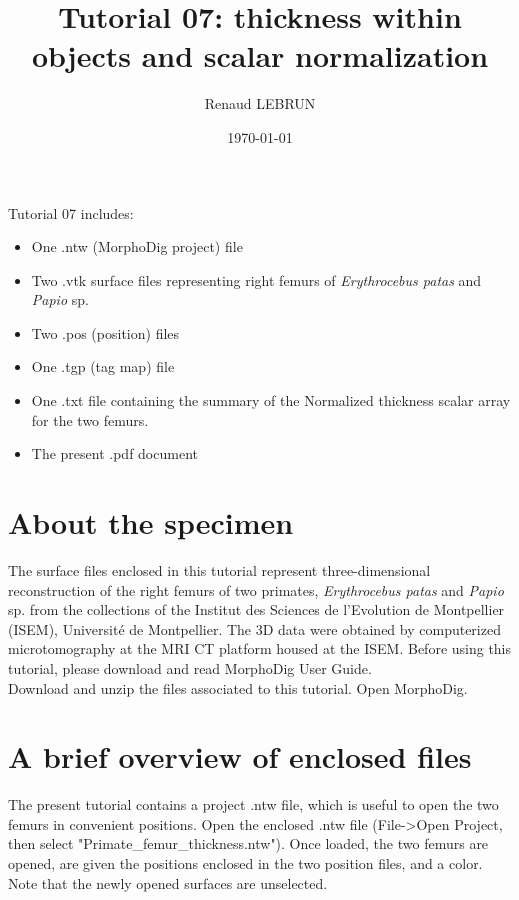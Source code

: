 \documentclass[12pt, a4paper]{book}
\title{Tutorial 07: thickness within objects and scalar normalization}
\author{Renaud LEBRUN}
\affil{Institut des Sciences de l'Evolution, Université de Montpellier, France}
\date{\today}
\begin{document}
	\dominitoc

\maketitle


\faketableofcontents



\minitoc 
Tutorial 07 includes:
\begin{itemize}
\item One .ntw (MorphoDig project) file
\item Two .vtk surface files representing right femurs of \textit{Erythrocebus patas} and \textit{Papio} sp.
\item Two .pos (position) files 
\item One .tgp (tag map) file 
\item One .txt file containing the summary of the Normalized thickness scalar array for the two femurs.
\item The present .pdf document
\end{itemize}



\section{About the specimen}

The surface files enclosed in this tutorial represent three-dimensional reconstruction of the right femurs of two primates, \textit{Erythrocebus patas} and \textit{Papio} sp. from the collections of the Institut des Sciences de l'Evolution de Montpellier (ISEM), Université de Montpellier. The 3D data were obtained by computerized microtomography at the MRI \si{\micro}CT platform housed at the ISEM.
Before using this tutorial, please download and read MorphoDig User Guide. \\

Download and unzip the files associated to this tutorial. Open MorphoDig.


\section{A brief overview of enclosed files}
The present tutorial contains a project .ntw file, which is useful to open the two femurs
 in convenient positions. Open the enclosed .ntw file (File->Open Project, then select
"Primate\_femur\_thickness.ntw"). Once loaded, the two femurs are opened, are given the positions
enclosed in the two position files, and a color. Note that the newly opened surfaces are unselected.
\end{document}
